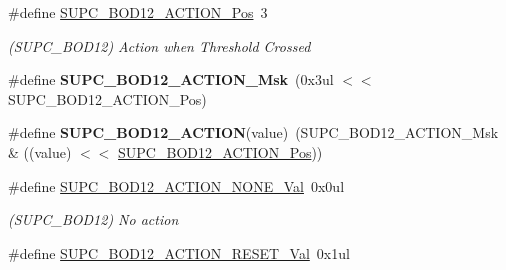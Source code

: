 \begin{DoxyCompactItemize}
\item 
\hypertarget{group___s_a_m_l21___s_u_p_c_gad1ccda9df0fab2362d28ce68c0d82edc}{}\#define \hyperlink{group___s_a_m_l21___s_u_p_c_gad1ccda9df0fab2362d28ce68c0d82edc}{S\+U\+P\+C\+\_\+\+B\+O\+D12\+\_\+\+A\+C\+T\+I\+O\+N\+\_\+\+Pos}~3\label{group___s_a_m_l21___s_u_p_c_gad1ccda9df0fab2362d28ce68c0d82edc}

\begin{DoxyCompactList}\small\item\em (S\+U\+P\+C\+\_\+\+B\+O\+D12) Action when Threshold Crossed \end{DoxyCompactList}\item 
\hypertarget{group___s_a_m_l21___s_u_p_c_ga299f7e56264b54677eda4fb3f81dbe19}{}\#define {\bfseries S\+U\+P\+C\+\_\+\+B\+O\+D12\+\_\+\+A\+C\+T\+I\+O\+N\+\_\+\+Msk}~(0x3ul $<$$<$ S\+U\+P\+C\+\_\+\+B\+O\+D12\+\_\+\+A\+C\+T\+I\+O\+N\+\_\+\+Pos)\label{group___s_a_m_l21___s_u_p_c_ga299f7e56264b54677eda4fb3f81dbe19}

\item 
\hypertarget{group___s_a_m_l21___s_u_p_c_ga4129d646a8924bed3685e75909b5c0b0}{}\#define {\bfseries S\+U\+P\+C\+\_\+\+B\+O\+D12\+\_\+\+A\+C\+T\+I\+O\+N}(value)~(S\+U\+P\+C\+\_\+\+B\+O\+D12\+\_\+\+A\+C\+T\+I\+O\+N\+\_\+\+Msk \& ((value) $<$$<$ \hyperlink{group___s_a_m_l21___s_u_p_c_gad1ccda9df0fab2362d28ce68c0d82edc}{S\+U\+P\+C\+\_\+\+B\+O\+D12\+\_\+\+A\+C\+T\+I\+O\+N\+\_\+\+Pos}))\label{group___s_a_m_l21___s_u_p_c_ga4129d646a8924bed3685e75909b5c0b0}

\item 
\hypertarget{group___s_a_m_l21___s_u_p_c_ga5e7845e1cb412b9f866e8ebca998649d}{}\#define \hyperlink{group___s_a_m_l21___s_u_p_c_ga5e7845e1cb412b9f866e8ebca998649d}{S\+U\+P\+C\+\_\+\+B\+O\+D12\+\_\+\+A\+C\+T\+I\+O\+N\+\_\+\+N\+O\+N\+E\+\_\+\+Val}~0x0ul\label{group___s_a_m_l21___s_u_p_c_ga5e7845e1cb412b9f866e8ebca998649d}

\begin{DoxyCompactList}\small\item\em (S\+U\+P\+C\+\_\+\+B\+O\+D12) No action \end{DoxyCompactList}\item 
\hypertarget{group___s_a_m_l21___s_u_p_c_ga14d7caf275fd219978d42d55ab27a522}{}\#define \hyperlink{group___s_a_m_l21___s_u_p_c_ga14d7caf275fd219978d42d55ab27a522}{S\+U\+P\+C\+\_\+\+B\+O\+D12\+\_\+\+A\+C\+T\+I\+O\+N\+\_\+\+R\+E\+S\+E\+T\+\_\+\+Val}~0x1ul\label{group___s_a_m_l21___s_u_p_c_ga14d7caf275fd219978d42d55ab27a522}


\end{DoxyCompactItemize}
